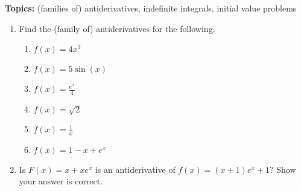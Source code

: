 \documentclass[11pt,fleqn]{article}
\begin{document}
\vspace*{-0.7in}

\begin{center}
  \Large{}
\end{center}
\textbf{Topics:} (families of) antiderivatives, indefinite integrals, initial value problems

\begin{enumerate}
\item Find the (family of) antiderivatives for the following.
	\begin{enumerate}
	\item $f(x)=4x^3$\\
	\vfill
		
	\item $f(x)=5\sin(x)$	\\
	\vfill
	
	\item $f(x) = \frac{e^x}{4}$	\\
	\vfill
	
	\item $f(x)=\sqrt{2}$\\
	\vfill
	
	\item $f(x)=\frac{1}{x}$\\
	\vfill
	
	\item $f(x) = 1-x+e^x$\\
	\vfill
	\end{enumerate}

\item Is $F(x)=x+xe^x$ is an antiderivative of $f(x)=(x+1)e^x+1$? Show your answer is correct.\\

\vspace{2in}


\end{enumerate}
\end{document}
